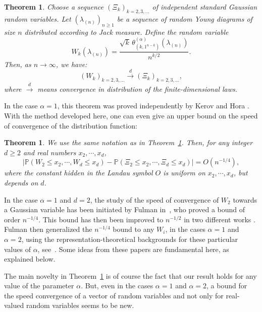 \documentclass[11pt]{amsart}
\theoremstyle{plain}
\newtheorem{theorem}[lemma]{Theorem}
\theoremstyle{remark}
\newcommand{\PP}{\mathbb{P}}
\begin{document}
\begin{theorem}
\label{theo:FluctuationsJackCharacters}
Choose a sequence $\left(\Xi_k \right)_{k=2,3,\dots}$
of independent standard Gaussian random variables.
Let $(\lambda_{(n)})_{n \ge 1}$ be a sequence of random Young diagrams of size $n$ distributed according to Jack measure.
Define the random variable
\[W_k(\lambda_{(n)}) = \frac{\sqrt{k} \, \theta^{(\alpha)}_{(k,1^{n-k})}(\lambda_{(n)})}{ n^{k/2}}.\]
Then, as $n \to \infty$, we have:
\[ \left( W_k \right)_{k=2,3,\dots}
\xrightarrow{d} \left( \Xi_k \right)_{k=2,3,\dots}, \]
where $\xrightarrow{d}$ means convergence in distribution of the finite-dimensional laws.
\end{theorem}

In the case $\alpha=1$, this theorem was proved independently by Kerov 
\cite{Kerov1993gaussian,IvanovOlshanski2002}
and Hora \cite{HoraFluctuationsCharacters}.
With the method developed here,
one can even give an upper bound on the speed of convergence of the distribution function:
\begin{theorem}
    We use the same notation as in Theorem~\ref{theo:FluctuationsJackCharacters}.
    Then, for any integer $d \ge2$ and real numbers $x_2,\cdots,x_d$,
    \[\big|\PP ( W_2 \le x_2, \cdots, W_d \le x_d) - \PP (\Xi_2 \le x_2, \cdots, \Xi_d \le x_d) \big|
     = O(n^{-1/4}),\]
    where the constant hidden in the Landau symbol $O$ 
    is {\em uniform} on $x_2,\cdots,x_d$, but depends on $d$.
    \label{theo:SpeedConvergence}
\end{theorem}

In the case $\alpha=1$ and $d=2$, the study of the speed of convergence
of $W_2$ towards a Gaussian variable has been initiated by Fulman
in~\cite{FulmanFluctuationChA2}, who proved a bound of order $n^{-1/4}$.
This bound has then been improved to $n^{-1/2}$ in two different
works \cite{SpeedCvCharacters1,SpeedCvCharacters2}.
Fulman then generalized the $n^{-1/4}$ bound to any $W_i$,
in the cases $\alpha=1$ and $\alpha=2$,
using the representation-theoretical backgrounds for these particular values of $\alpha$,
see~\cite{FulmanSpeedCvRepresentations}.
Some ideas from these papers are fundamental here, as explained below.

The main novelty in Theorem~\ref{theo:SpeedConvergence}
is of course the fact that our result holds
for any value of the parameter $\alpha$.
But, even in the cases $\alpha=1$ and $\alpha=2$,
a bound for the speed convergence of a vector of random variables
and not only for real-valued random variables seems to be new.
\end{document}
